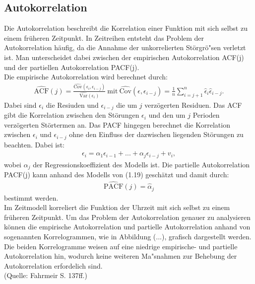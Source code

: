 \documentclass[12pt]{scrreprt}
\begin{document}
\subsection{Autokorrelation}
Die Autokorrelation beschreibt die Korrelation einer Funktion mit sich selbst zu einem früheren Zeitpunkt. In Zeitreihen entsteht das Problem der Autokorrelation häufig, da die Annahme der unkorrelierten Störgrö"sen verletzt ist. Man unterscheidet dabei zwischen der empirischen Autokorrelation ACF(j) und der partiellen Autokorrelation PACF(j).\\
Die empirische Autokorrelation wird berechnet durch:
\begin{align}
\widehat{\text{ACF}}(j)=\frac{\widehat{\text{Cov}}(\epsilon_{i},\epsilon_{i-j})}{\widehat{\text{Var}}(\epsilon_{i})} ~\text{mit} ~\widehat{\text{Cov}}(\epsilon,\epsilon_{i-j})=\frac{1}{n}\sum_{i=j+1}^{n}\hat{\epsilon}_{i}\hat{\epsilon}_{i-j}.
\end{align}
Dabei sind $\epsilon_{i}$ die Resiuden und $\epsilon_{i-j}$ die um $j$ verzögerten Residuen. Das ACF gibt die Korrelation zwischen den Störungen $\epsilon_{i}$ und den um $j$ Perioden verzögerten Störtermen an. Das PACF hingegen berechnet die Korrelation zwischen $\epsilon_{i}$ und $\epsilon_{i-j}$ ohne den Einfluss der dazwischen liegenden Störungen zu beachten. Dabei ist:
\begin{align}
\epsilon_{i}=\alpha_{1}\epsilon_{i-1}+...+\alpha_{j}\epsilon_{i-j}
+v_{i},
\end{align}
wobei $\alpha_{j}$ der Regressionskoeffizient des Modells ist. Die partielle Autokorrelation PACF(j) kann anhand des Modells von (1.19) geschätzt und damit durch:
\begin{align}
\widehat{\text{PACF}}(j)=\hat{\alpha}_{j}
\end{align}
bestimmt werden.\\
Im Zeitmodell korreliert die Funktion der Uhrzeit mit sich selbst zu einem früheren Zeitpunkt. Um das Problem der Autokorrelation genauer zu analysieren können die empirische Autokorrelation und partielle Autokorrelation anhand von sogenannten Korrelogrammen, wie in Abbildung (...), grafisch dargestellt werden. Die beiden Korrelogramme weisen auf eine niedrige empirische- und partielle Autokorrelation hin, wodurch keine weiteren Ma"snahmen zur Behebung der Autokorrelation erfordelich sind.\\
(Quelle: Fahrmeir S. 137ff.)
\end{document}
